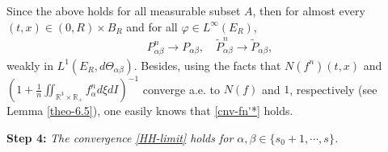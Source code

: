 \documentclass[reqno,11pt]{amsart}
\numberwithin{equation}{section}
\def\R{\mathbb{R}}
\begin{document}
Since the above holds for all measurable subset $A$, then for almost every $(t,x) \in ( 0,R) \times B_R$ and for all $\varphi \in L^\infty ( E_R)$, 
\begin{align*}
	  P^n_{\alpha \beta} \rightarrow P_{\alpha \beta}, \quad   \tilde{P}^n_{\alpha \beta} \rightarrow \tilde{P}_{\alpha \beta},
\end{align*} 
weakly in $L^1 ( E_R ,d \Theta_{\alpha \beta})$.  Besides, using the facts that $N(f^n) ( t,x)$ and $\left( 1+ \frac{1}{n} \iint_{\R^3 \times \R_+} f^n_\alpha  d \xi dI  \right)^{-1}$ converge a.e. to $N(f)$ and $1$, respectively (see Lemma \ref{theo-6.5}), one easily knows that \eqref{cnv-fn'*} holds.  













{\bf Step 4:} {\em The convergence \eqref{HH-limit} holds for $\alpha, \beta \in \{ s_0 + 1, \cdots, s \}$.}
\end{document}
